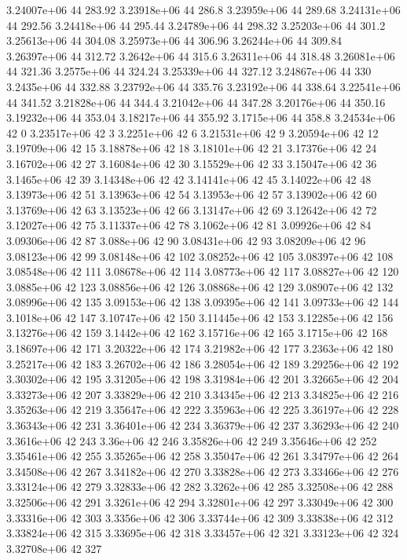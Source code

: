 3.24007e+06 44 283.92
3.23918e+06 44 286.8
3.23959e+06 44 289.68
3.24131e+06 44 292.56
3.24418e+06 44 295.44
3.24789e+06 44 298.32
3.25203e+06 44 301.2
3.25613e+06 44 304.08
3.25973e+06 44 306.96
3.26244e+06 44 309.84
3.26397e+06 44 312.72
3.2642e+06 44 315.6
3.26311e+06 44 318.48
3.26081e+06 44 321.36
3.2575e+06 44 324.24
3.25339e+06 44 327.12
3.24867e+06 44 330
3.2435e+06 44 332.88
3.23792e+06 44 335.76
3.23192e+06 44 338.64
3.22541e+06 44 341.52
3.21828e+06 44 344.4
3.21042e+06 44 347.28
3.20176e+06 44 350.16
3.19232e+06 44 353.04
3.18217e+06 44 355.92
3.1715e+06 44 358.8
3.24534e+06 42 0
3.23517e+06 42 3
3.2251e+06 42 6
3.21531e+06 42 9
3.20594e+06 42 12
3.19709e+06 42 15
3.18878e+06 42 18
3.18101e+06 42 21
3.17376e+06 42 24
3.16702e+06 42 27
3.16084e+06 42 30
3.15529e+06 42 33
3.15047e+06 42 36
3.1465e+06 42 39
3.14348e+06 42 42
3.14141e+06 42 45
3.14022e+06 42 48
3.13973e+06 42 51
3.13963e+06 42 54
3.13953e+06 42 57
3.13902e+06 42 60
3.13769e+06 42 63
3.13523e+06 42 66
3.13147e+06 42 69
3.12642e+06 42 72
3.12027e+06 42 75
3.11337e+06 42 78
3.1062e+06 42 81
3.09926e+06 42 84
3.09306e+06 42 87
3.088e+06 42 90
3.08431e+06 42 93
3.08209e+06 42 96
3.08123e+06 42 99
3.08148e+06 42 102
3.08252e+06 42 105
3.08397e+06 42 108
3.08548e+06 42 111
3.08678e+06 42 114
3.08773e+06 42 117
3.08827e+06 42 120
3.0885e+06 42 123
3.08856e+06 42 126
3.08868e+06 42 129
3.08907e+06 42 132
3.08996e+06 42 135
3.09153e+06 42 138
3.09395e+06 42 141
3.09733e+06 42 144
3.1018e+06 42 147
3.10747e+06 42 150
3.11445e+06 42 153
3.12285e+06 42 156
3.13276e+06 42 159
3.1442e+06 42 162
3.15716e+06 42 165
3.1715e+06 42 168
3.18697e+06 42 171
3.20322e+06 42 174
3.21982e+06 42 177
3.2363e+06 42 180
3.25217e+06 42 183
3.26702e+06 42 186
3.28054e+06 42 189
3.29256e+06 42 192
3.30302e+06 42 195
3.31205e+06 42 198
3.31984e+06 42 201
3.32665e+06 42 204
3.33273e+06 42 207
3.33829e+06 42 210
3.34345e+06 42 213
3.34825e+06 42 216
3.35263e+06 42 219
3.35647e+06 42 222
3.35963e+06 42 225
3.36197e+06 42 228
3.36343e+06 42 231
3.36401e+06 42 234
3.36379e+06 42 237
3.36293e+06 42 240
3.3616e+06 42 243
3.36e+06 42 246
3.35826e+06 42 249
3.35646e+06 42 252
3.35461e+06 42 255
3.35265e+06 42 258
3.35047e+06 42 261
3.34797e+06 42 264
3.34508e+06 42 267
3.34182e+06 42 270
3.33828e+06 42 273
3.33466e+06 42 276
3.33124e+06 42 279
3.32833e+06 42 282
3.3262e+06 42 285
3.32508e+06 42 288
3.32506e+06 42 291
3.3261e+06 42 294
3.32801e+06 42 297
3.33049e+06 42 300
3.33316e+06 42 303
3.3356e+06 42 306
3.33744e+06 42 309
3.33838e+06 42 312
3.33824e+06 42 315
3.33695e+06 42 318
3.33457e+06 42 321
3.33123e+06 42 324
3.32708e+06 42 327
